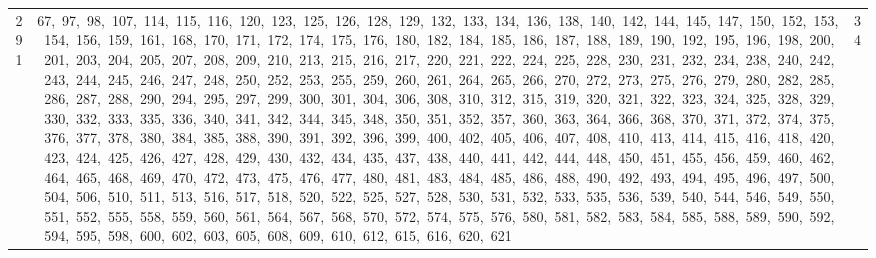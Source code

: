 \begin{longtable}{c|p{}|r}
291 & 67,\ 97,\ 98,\ 107,\ 114,\ 115,\ 116,\ 120,\ 123,\ 125,\ 126,\ 128,\ 129,\ 132,\ 133,\ 134,\ 136,\ 138,\ 140,\ 142,\ 144,\ 145,\ 147,\ 150,\ 152,\ 153,\ 154,\ 156,\ 159,\ 161,\ 168,\ 170,\ 171,\ 172,\ 174,\ 175,\ 176,\ 180,\ 182,\ 184,\ 185,\ 186,\ 187,\ 188,\ 189,\ 190,\ 192,\ 195,\ 196,\ 198,\ 200,\ 201,\ 203,\ 204,\ 205,\ 207,\ 208,\ 209,\ 210,\ 213,\ 215,\ 216,\ 217,\ 220,\ 221,\ 222,\ 224,\ 225,\ 228,\ 230,\ 231,\ 232,\ 234,\ 238,\ 240,\ 242,\ 243,\ 244,\ 245,\ 246,\ 247,\ 248,\ 250,\ 252,\ 253,\ 255,\ 259,\ 260,\ 261,\ 264,\ 265,\ 266,\ 270,\ 272,\ 273,\ 275,\ 276,\ 279,\ 280,\ 282,\ 285,\ 286,\ 287,\ 288,\ 290,\ 294,\ 295,\ 297,\ 299,\ 300,\ 301,\ 304,\ 306,\ 308,\ 310,\ 312,\ 315,\ 319,\ 320,\ 321,\ 322,\ 323,\ 324,\ 325,\ 328,\ 329,\ 330,\ 332,\ 333,\ 335,\ 336,\ 340,\ 341,\ 342,\ 344,\ 345,\ 348,\ 350,\ 351,\ 352,\ 357,\ 360,\ 363,\ 364,\ 366,\ 368,\ 370,\ 371,\ 372,\ 374,\ 375,\ 376,\ 377,\ 378,\ 380,\ 384,\ 385,\ 388,\ 390,\ 391,\ 392,\ 396,\ 399,\ 400,\ 402,\ 405,\ 406,\ 407,\ 408,\ 410,\ 413,\ 414,\ 415,\ 416,\ 418,\ 420,\ 423,\ 424,\ 425,\ 426,\ 427,\ 428,\ 429,\ 430,\ 432,\ 434,\ 435,\ 437,\ 438,\ 440,\ 441,\ 442,\ 444,\ 448,\ 450,\ 451,\ 455,\ 456,\ 459,\ 460,\ 462,\ 464,\ 465,\ 468,\ 469,\ 470,\ 472,\ 473,\ 475,\ 476,\ 477,\ 480,\ 481,\ 483,\ 484,\ 485,\ 486,\ 488,\ 490,\ 492,\ 493,\ 494,\ 495,\ 496,\ 497,\ 500,\ 504,\ 506,\ 510,\ 511,\ 513,\ 516,\ 517,\ 518,\ 520,\ 522,\ 525,\ 527,\ 528,\ 530,\ 531,\ 532,\ 533,\ 535,\ 536,\ 539,\ 540,\ 544,\ 546,\ 549,\ 550,\ 551,\ 552,\ 555,\ 558,\ 559,\ 560,\ 561,\ 564,\ 567,\ 568,\ 570,\ 572,\ 574,\ 575,\ 576,\ 580,\ 581,\ 582,\ 583,\ 584,\ 585,\ 588,\ 589,\ 590,\ 592,\ 594,\ 595,\ 598,\ 600,\ 602,\ 603,\ 605,\ 608,\ 609,\ 610,\ 612,\ 615,\ 616,\ 620,\ 621 & 34 \\

\end{longtable}
